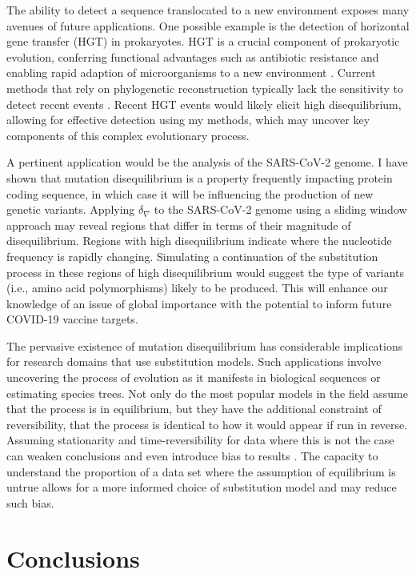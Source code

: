 The ability to detect a sequence translocated to a new environment exposes many avenues of future applications. One possible example is the detection of horizontal gene transfer (HGT) in prokaryotes. HGT is a crucial component of prokaryotic evolution, conferring functional advantages such as antibiotic resistance and enabling rapid adaption of microorganisms to a new environment \citep{Soucy2015HorizontalLife}. Current methods that rely on phylogenetic reconstruction typically lack the sensitivity to detect recent events \citep{Li2018AStrains}. Recent HGT events would likely elicit high disequilibrium, allowing for effective detection using my methods, which may uncover key components of this complex evolutionary process. 

A pertinent application would be the analysis of the SARS-CoV-2 genome. I have shown that mutation disequilibrium is a property frequently impacting protein coding sequence, in which case it will be influencing the production of new genetic variants. Applying $\delta_\nabla$ to the SARS-CoV-2 genome using a sliding window approach may reveal regions that differ in terms of their magnitude of disequilibrium. Regions with high disequilibrium indicate where the nucleotide frequency is rapidly changing. Simulating a continuation of the substitution process in these regions of high disequilibrium would suggest the type of variants (i.e., amino acid polymorphisms) likely to be produced. This will enhance our knowledge of an issue of global importance with the potential to inform future COVID-19 vaccine targets. 

The pervasive existence of mutation disequilibrium has considerable implications for research domains that use substitution models. Such applications involve uncovering the process of evolution as it manifests in biological sequences or estimating species trees. Not only do the most popular models in the field assume that the process is in equilibrium, but they have the additional constraint of reversibility, that the process is identical to how it would appear if run in reverse. Assuming stationarity and time-reversibility for data where this is not the case can weaken conclusions and even introduce bias to results \citep{Kaehler2015}. The capacity to understand the proportion of a data set where the assumption of equilibrium is untrue allows for a more informed choice of substitution model and may reduce such bias. 

\section{Conclusions}

